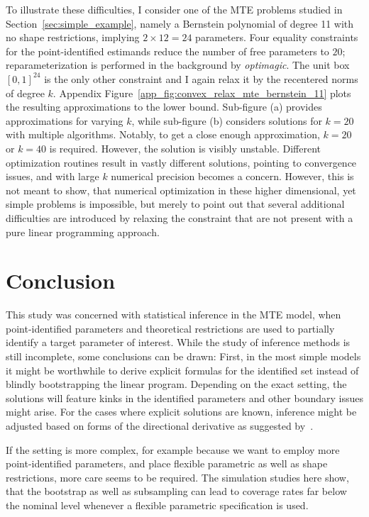 \documentclass[12pt,a4paper,english]{article} %
\numberwithin{equation}{section}
\theoremstyle{definition}
\theoremstyle{remark}
\theoremstyle{plain}
\begin{document}
To illustrate these difficulties, I consider one of the MTE problems studied in Section~\ref{sec:simple_example}, namely a Bernstein polynomial of degree 11 with no shape restrictions, implying $2\times12=24$ parameters.
Four equality constraints for the point-identified estimands reduce the number of free parameters to $20$; reparameterization is performed in the background by \textit{optimagic}.
The unit box $[0,1]^{24}$ is the only other constraint and I again relax it by the recentered norms of degree $k$.
Appendix Figure~\ref{app_fig:convex_relax_mte_bernstein_11} plots the resulting approximations to the lower bound.
Sub-figure (a) provides approximations for varying $k$, while sub-figure (b) considers solutions for $k=20$ with multiple algorithms.
Notably, to get a close enough approximation, $k=20$ or $k=40$ is required. However, the solution is visibly unstable.
Different optimization routines result in vastly different solutions, pointing to convergence issues, and with large $k$ numerical precision becomes a concern.
However, this is not meant to show, that numerical optimization in these higher dimensional, yet simple problems is impossible, but merely to point out that several additional difficulties are introduced by relaxing the constraint that are not present with a pure linear programming approach.


\section{Conclusion}
This study was concerned with statistical inference in the MTE model, when point-identified parameters and theoretical restrictions are used to partially identify a target parameter of interest.
While the study of inference methods is still incomplete, some conclusions can be drawn:
First, in the most simple models it might be worthwhile to derive explicit formulas for the identified set instead of blindly bootstrapping the linear program.
Depending on the exact setting, the solutions will feature kinks in the identified parameters and other boundary issues might arise.
For the cases where explicit solutions are known, inference might be adjusted based on forms of the directional derivative as suggested by~\cite{fang2019infdirdiff}.

If the setting is more complex, for example because we want to employ more point-identified parameters, and place flexible parametric as well as shape restrictions, more care seems to be required.
The simulation studies here show, that the bootstrap as well as subsampling can lead to coverage rates far below the nominal level whenever a flexible parametric specification is used.
\end{document}
